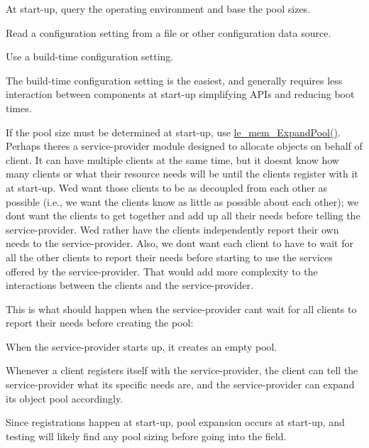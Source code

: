 \begin{DoxyItemize}
\item At start-\/up, query the operating environment and base the pool sizes.
\item Read a configuration setting from a file or other configuration data source.
\item Use a build-\/time configuration setting.
\end{DoxyItemize}

The build-\/time configuration setting is the easiest, and generally requires less interaction between components at start-\/up simplifying A\+P\+Is and reducing boot times.

If the pool size must be determined at start-\/up, use {\ttfamily \hyperlink{le__mem_8h_a79a4321ffa0345f267eaf3b7d3d3528a}{le\+\_\+mem\+\_\+\+Expand\+Pool()}}. Perhaps there\textquotesingle{}s a service-\/provider module designed to allocate objects on behalf of client. It can have multiple clients at the same time, but it doesn\textquotesingle{}t know how many clients or what their resource needs will be until the clients register with it at start-\/up. We\textquotesingle{}d want those clients to be as decoupled from each other as possible (i.\+e., we want the clients know as little as possible about each other); we don\textquotesingle{}t want the clients to get together and add up all their needs before telling the service-\/provider. We\textquotesingle{}d rather have the clients independently report their own needs to the service-\/provider. Also, we don\textquotesingle{}t want each client to have to wait for all the other clients to report their needs before starting to use the services offered by the service-\/provider. That would add more complexity to the interactions between the clients and the service-\/provider.

This is what should happen when the service-\/provider can\textquotesingle{}t wait for all clients to report their needs before creating the pool\+:
\begin{DoxyItemize}
\item When the service-\/provider starts up, it creates an empty pool.
\item Whenever a client registers itself with the service-\/provider, the client can tell the service-\/provider what its specific needs are, and the service-\/provider can expand its object pool accordingly.
\item Since registrations happen at start-\/up, pool expansion occurs at start-\/up, and testing will likely find any pool sizing before going into the field.
\end{DoxyItemize}


